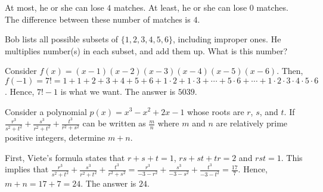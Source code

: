 \begin{solution}
At most, he or she can lose $4$ matches. At least, he or she can lose $0$ matches. The difference between these number of matches is $4$.
\end{solution}

\begin{problem}
Bob lists all possible subsets of $\{1,2,3,4,5,6\}$, including improper ones. He multiplies number(s) in each subset, and add them up. What is this number?
\end{problem}

\begin{solution}
Consider $f(x)=(x-1)(x-2)(x-3)(x-4)(x-5)(x-6)$. Then, $f(-1)=7!=1+1+2+3+4+5+6+1\cdot2+1\cdot3+\cdots+5\cdot6+\cdots+1\cdot2\cdot3\cdot4\cdot5\cdot6$. Hence, $7!-1$ is what we want. The answer is $5039$.
\end{solution}

\begin{problem}
Consider a polynomial $p(x)=x^3-x^2+2x-1$ whose roots are $r$, $s$, and $t$. If $\frac{r^3}{s^2+t^2}+\frac{s^3}{r^2+t^2}+\frac{t^3}{r^2+s^2}$ can be written as $\frac{m}{n}$ where $m$ and $n$ are relatively prime positive integers, determine $m+n$.
\end{problem}

\begin{solution}
First, Viete's formula states that $r+s+t=1$, $rs+st+tr=2$ and $rst=1$. This implies that $\frac{r^3}{s^2+t^2}+\frac{s^3}{r^2+t^2}+\frac{t^3}{r^2+s^2}=\frac{r^3}{-3-r^2}+\frac{s^3}{-3-s^2}+\frac{t^3}{-3-t^2}=\frac{17}{7}$. Hence, $m+n=17+7=24$. The answer is $24$.
\end{solution}